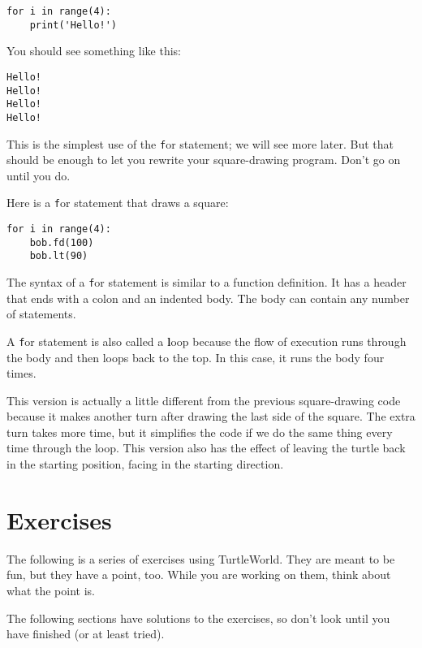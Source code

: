 \documentclass[
DIV=11,
fontsize=13,
twoside,
headinclude=false,
titlepage=firstiscover,
abstract=true,
headsepline=true,
footsepline=true,
chapterprefix=true, %
headings=big,
bibliography=totoc,%
captions=tableheading
]{scrbook}
\theoremstyle{definition}
\begin{document}
\begin{lstlisting}
for i in range(4):
    print('Hello!')
\end{lstlisting}
%
You should see something like this:

\begin{lstlisting}
Hello!
Hello!
Hello!
Hello!
\end{lstlisting}
%
This is the simplest use of the {\texttt for} statement; we will see
more later.  But that should be enough to let you rewrite your
square-drawing program.  Don't go on until you do.

Here is a {\texttt for} statement that draws a square:

\begin{lstlisting}
for i in range(4):
    bob.fd(100)
    bob.lt(90)
\end{lstlisting}
%
The syntax of a {\texttt for} statement is similar to a function
definition.  It has a header that ends with a colon and an indented
body.  The body can contain any number of statements.

A {\texttt for} statement is also called a {\textbf loop} because
the flow of execution runs through the body and then loops back
to the top.  In this case, it runs the body four times.

This version is actually a little different from the previous
square-drawing code because it makes another turn after
drawing the last side of the square.  The extra turn takes
more time, but it simplifies the code if we do the same thing
every time through the loop.  This version also has the effect
of leaving the turtle back in the starting position, facing in
the starting direction.

\section{Exercises}

The following is a series of exercises using TurtleWorld.  They
are meant to be fun, but they have a point, too.  While you are
working on them, think about what the point is.

The following sections have solutions to the exercises, so
don't look until you have finished (or at least tried).
\end{document}
